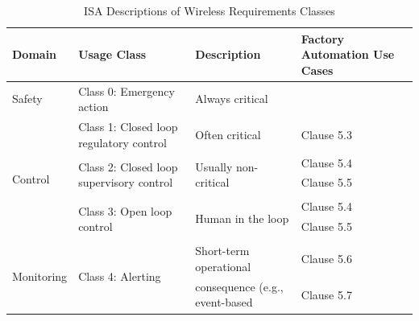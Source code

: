 \begin{table}[!tb]
	\centering
	\caption{ISA Descriptions of Wireless Requirements Classes}

	\begin{adjustbox}{width=\columnwidth,center}
		
	\begin{tabular}{|l|l|p{10.645em}|p{10em}|}
		\toprule
		\multicolumn{1}{|p{6.355em}|}{\textbf{Domain}} & \multicolumn{1}{p{13.07em}|}{\textbf{Usage Class}} & \textbf{Description} & \textbf{Factory Automation Use Cases} \\
		\midrule
		\multicolumn{1}{|l|}{\multirow{2}[2]{*}{Safety}} & \multicolumn{1}{l|}{\multirow{2}[2]{*}{Class 0:  Emergency action}} & \multirow{2}[2]{*}{Always critical } & \multicolumn{1}{l|}{\multirow{2}[2]{*}{}} \\
		&       & \multicolumn{1}{l|}{} & \multicolumn{1}{l|}{} \\
		\midrule
		\multicolumn{1}{|l|}{\multirow{8}[6]{*}{Control}} & \multicolumn{1}{l|}{\multirow{2}[2]{*}{Class 1:  Closed loop regulatory control}} & \multirow{2}[2]{*}{Often critical } & \multirow{2}[2]{*}{Clause 5.3 } \\
		&       & \multicolumn{1}{l|}{} & \multicolumn{1}{l|}{} \\
		\cmidrule{2-4}      & \multicolumn{1}{l|}{\multirow{3}[2]{*}{Class 2:  Closed loop supervisory control}} & \multirow{3}[2]{*}{Usually non-critical } & Clause 5.4  \\
		&       & \multicolumn{1}{l|}{} & Clause 5.5  \\
		&       & \multicolumn{1}{l|}{} & \multicolumn{1}{l|}{} \\
		\cmidrule{2-4}      & \multicolumn{1}{l|}{\multirow{3}[2]{*}{Class 3:  Open loop control}} & \multirow{3}[2]{*}{Human in the loop } & Clause 5.4  \\
		&       & \multicolumn{1}{l|}{} & Clause 5.5  \\
		&       & \multicolumn{1}{l|}{} & \multicolumn{1}{l|}{} \\
		\midrule
		\multicolumn{1}{|l|}{\multirow{9}[4]{*}{Monitoring }} & \multicolumn{1}{l|}{\multirow{5}[2]{*}{Class 4:  Alerting}} & Short-term operational  & Clause 5.6  \\
		&       & consequence (e.g., event-based  & Clause 5.7  \\

\end{tabular}
\end{adjustbox}
\end{table}
